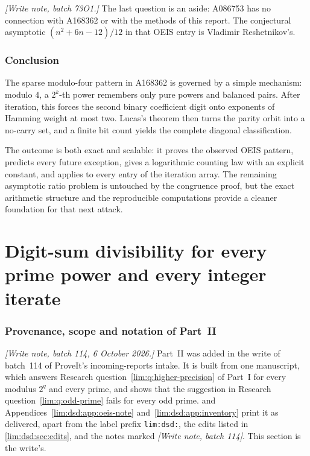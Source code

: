 \documentclass[11pt]{article}
\theoremstyle{definition}
\theoremstyle{remark}
\begin{document}
\emph{[Write note, batch 73O1.]} The last question is an aside: A086753
has no connection with A168362 or with the methods of this report. The
conjectural asymptotic $(n^2+6n-12)/12$ in that OEIS entry is Vladimir
Reshetnikov's.

\section{Conclusion}

The sparse modulo-four pattern in A168362 is governed by a simple mechanism:
modulo $4$, a $2^k$-th power remembers only pure powers and balanced pairs.
After iteration, this forces the second binary coefficient digit onto
exponents of Hamming weight at most two.  Lucas's theorem then turns the
parity orbit into a no-carry set, and a finite bit count yields the complete
diagonal classification.

The outcome is both exact and scalable: it proves the observed OEIS pattern,
predicts every future exception, gives a logarithmic counting law with an
explicit constant, and applies to every entry of the iteration array.  The
remaining asymptotic ratio problem is untouched by the congruence proof, but
the exact arithmetic structure and the reproducible computations provide a
cleaner foundation for that next attack.

\part{Digit-sum divisibility for every prime power and every integer iterate}
\label{lim:dsd:part}
\setlength{\emergencystretch}{1.5em}

\section{Provenance, scope and notation of Part~II}
\label{lim:dsd:sec:front}

\emph{[Write note, batch 114, 6 October 2026.]} Part~II was added in the
write of batch~114 of ProveIt's incoming-reports intake. It is built from
one manuscript, which answers Research question~\ref{lim:q:higher-precision}
of Part~I for every modulus $2^q$ and every prime, and shows that the
suggestion in Research question~\ref{lim:q:odd-prime} fails for every odd
prime. 
and Appendices~\ref{lim:dsd:app:oeis-note} and~\ref{lim:dsd:app:inventory}
print it as delivered, apart from the label prefix \texttt{lim:dsd:}, the
edits listed in \cref{lim:dsd:sec:edits}, and the notes marked
\emph{[Write note, batch 114]}. This section is the write's.
\end{document}
